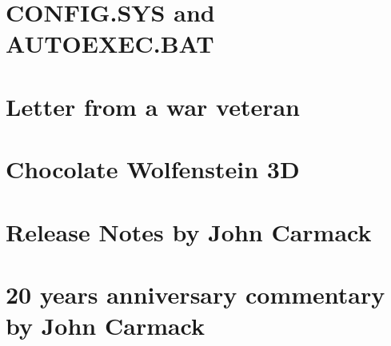 \documentclass[12pt]{book}
\begin{document}
    \chapter{CONFIG.SYS and AUTOEXEC.BAT}
         
    \chapter{Letter from a war veteran}
    \chapter{Chocolate Wolfenstein 3D}
    \chapter{Release Notes by John Carmack}
        
    \chapter{20 years anniversary commentary by John Carmack}
        
    
    
\end{document}
